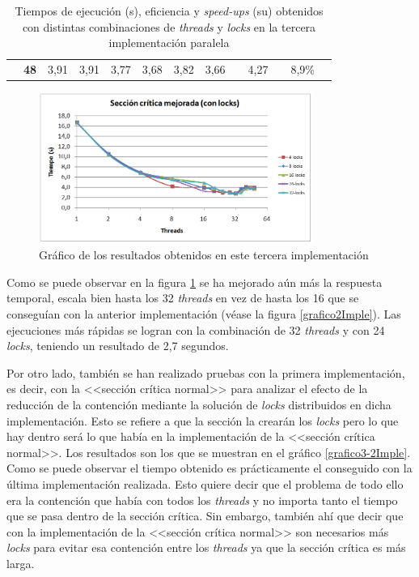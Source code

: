 \begin{table}[H]
\begin{tabular}{lc|c|c|c|c|c|c|lcccl}
		\multicolumn{1}{|l|}{}                                & {\bf 48}              & 3,91    & 3,91    & 3,77     & 3,68     & 3,82     & 3,66     & \multicolumn{1}{l|}{} & \multicolumn{1}{c|}{4,27}     & \multicolumn{1}{c|}{} & \multicolumn{1}{c|}{8,9\%}      &  \\ \cline{1-8} \cline{10-10} \cline{12-12}
	\end{tabular}
	\caption{Tiempos de ejecuci\'{o}n (s),  eficiencia y \textit{speed-ups} (su) obtenidos con distintas combinaciones de \textit{threads} y \textit{locks} en la tercera implementaci\'{o}n paralela}
\end{table}

\begin{figure}[H]
	\captionsetup{justification=centering}
	\centering
	\includegraphics[width=0.8\textwidth]{./imagenes/grafico3Imple}
	\caption{Gr\'{a}fico de los resultados obtenidos en este tercera implementaci\'{o}n}
	\label{Implementacion3}
\end{figure}

Como se puede observar en la figura \ref{Implementacion3} se ha mejorado a\'{u}n m\'{a}s la respuesta temporal, escala bien hasta los 32 \textit{threads} en vez de hasta los 16 que se consegu\'{i}an con la anterior implementaci\'{o}n (v\'{e}ase la figura \ref{grafico2Imple}). Las ejecuciones m\'{a}s r\'{a}pidas se logran con la combinaci\'{o}n de 32 \textit{threads} y con 24 \textit{locks}, teniendo un resultado de 2,7 segundos. 

Por otro lado, tambi\'{e}n se han realizado pruebas con la primera implementaci\'{o}n, es decir, con la <<secci\'{o}n cr\'{i}tica normal>> para analizar el efecto de la reducci\'{o}n de la contenci\'{o}n mediante la soluci\'{o}n de \textit{locks} distribuidos en dicha implementaci\'{o}n. Esto se refiere a que la secci\'{o}n la crear\'{a}n los \textit{locks} pero lo que hay dentro ser\'{a} lo que hab\'{i}a en la implementaci\'{o}n de la <<secci\'{o}n cr\'{i}tica normal>>. Los resultados son los que se muestran en el gr\'{a}fico \ref{grafico3-2Imple}. Como se puede observar el tiempo obtenido es pr\'{a}cticamente el conseguido con la \'{u}ltima implementaci\'{o}n realizada. Esto quiere decir que el problema de todo ello era la contenci\'{o}n que hab\'{i}a con todos los \textit{threads} y no importa tanto el tiempo que se pasa dentro de la secci\'{o}n cr\'{i}tica. Sin embargo, tambi\'{e}n ah\'{i} que decir que con la implementaci\'{o}n de la <<secci\'{o}n cr\'{i}tica normal>> son necesarios m\'{a}s \textit{locks} para evitar esa contenci\'{o}n entre los \textit{threads} ya que la secci\'{o}n cr\'{i}tica es m\'{a}s larga.

